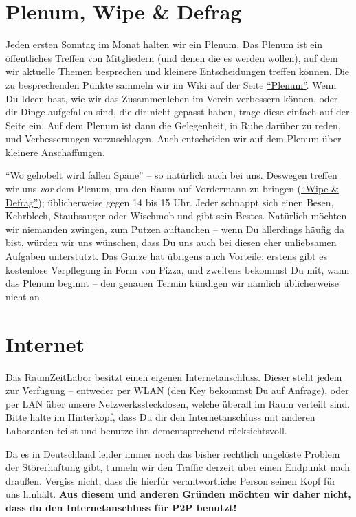\documentclass[12pt, DIV16, a4paper]{scrartcl}
\begin{document}
\section*{Plenum, Wipe \& Defrag}

Jeden ersten Sonntag im Monat halten wir ein Plenum. Das Plenum ist ein
öffentliches Treffen von Mitgliedern (und denen die es werden wollen), auf dem
wir aktuelle Themen besprechen und kleinere Entscheidungen treffen können. Die
zu besprechenden Punkte sammeln wir im Wiki auf der Seite
\href{https://raumzeitlabor.de/wiki/Plenum}{``Plenum''}. Wenn Du Ideen hast, wie
wir das Zusammenleben im Verein verbessern können, oder dir Dinge aufgefallen
sind, die dir nicht gepasst haben, trage diese einfach auf der Seite ein. Auf
dem Plenum ist dann die Gelegenheit, in Ruhe darüber zu reden, und
Verbesserungen vorzuschlagen. Auch entscheiden wir auf dem Plenum über kleinere
Anschaffungen. \np

``Wo gehobelt wird fallen Späne'' -- so natürlich auch bei uns. Deswegen treffen
wir uns \emph{vor} dem Plenum, um den Raum auf Vordermann zu bringen
(\href{https://raumzeitlabor.de/wiki/Wipe_\%26_Defrag}{``Wipe \& Defrag''});
üblicherweise gegen 14 bis 15 Uhr. Jeder schnappt sich einen Besen, Kehrblech,
Staubsauger oder Wischmob und gibt sein Bestes. Natürlich möchten wir niemanden
zwingen, zum Putzen auftauchen -- wenn Du allerdings häufig da bist, würden wir
uns wünschen, dass Du uns auch bei diesen eher unliebsamen Aufgaben unterstützt.
Das Ganze hat übrigens auch Vorteile: erstens gibt es kostenlose Verpflegung in
Form von Pizza, und zweitens bekommst Du mit, wann das Plenum beginnt -- den
genauen Termin kündigen wir nämlich üblicherweise nicht an.

\section*{Internet}

Das RaumZeitLabor besitzt einen eigenen Internetanschluss. Dieser steht jedem
zur Verfügung -- entweder per WLAN (den Key bekommst Du auf Anfrage), oder per
LAN über unsere Netzwerkssteckdosen, welche überall im Raum verteilt sind. Bitte
halte im Hinterkopf, dass Du dir den Internetanschluss mit anderen Laboranten
teilst und benutze ihn dementsprechend rücksichtsvoll.
\np

Da es in Deutschland leider immer noch das bisher rechtlich ungelöste Problem
der Störerhaftung gibt, tunneln wir den Traffic derzeit über einen Endpunkt nach
draußen. Vergiss nicht, dass die hierfür verantwortliche Person seinen Kopf für
uns hinhält. \textbf{Aus diesem und anderen Gründen möchten wir daher nicht,
dass du den Internetanschluss für P2P benutzt!}
\end{document}
